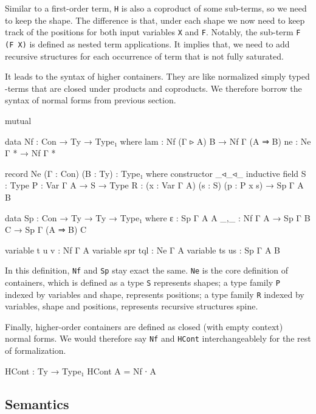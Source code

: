 Similar to a first-order term, \texttt{H} is also a coproduct of some sub-terms, so we need to keep the shape. The difference is that, under each shape we now need to keep track of the positions for both input variables \texttt{X} and \texttt{F}. Notably, the sub-term \texttt{F (F X)} is defined as nested term applications. It implies that, we need to add recursive structures for each occurrence of term that is not fully saturated.

It leads to the syntax of higher containers. They are like normalized simply typed \lambda-terms that are closed under products and coproducts. We therefore borrow the syntax of normal forms from previous section.

\begin{code}[hide]
mutual
\end{code}

\begin{code}
  data Nf : Con → Ty → Type₁ where
    lam : Nf (Γ ▹ A) B → Nf Γ (A ⇒ B)
    ne  : Ne Γ * → Nf Γ *

  record Ne (Γ : Con) (B : Ty) : Type₁ where
    constructor _◃_◃_
    inductive
    field
      S : Type
      P : Var Γ A → S → Type
      R : (x : Var Γ A) (s : S) (p : P x s) → Sp Γ A B

  data Sp : Con → Ty → Ty → Type₁ where
    ε   : Sp Γ A A
    _,_ : Nf Γ A → Sp Γ B C → Sp Γ (A ⇒ B) C
\end{code}

\begin{code}[hide]
  variable t u v : Nf Γ A
  variable spr tql : Ne Γ A
  variable ts us : Sp Γ A B
\end{code}

In this definition, \texttt{Nf} and \texttt{Sp} stay exact the same. \texttt{Ne} is the core definition of containers, which is defined as a type \texttt{S} represents shapes; a type family \texttt{P} indexed by variables and shape, represents positions; a type family \texttt{R} indexed by variables, shape and positions, represents recursive structures spine.

Finally, higher-order containers are defined as closed (with empty context) normal forms. We would therefore say \texttt{Nf} and \texttt{HCont} interchangeablely for the rest of formalization. 

\begin{code}
HCont : Ty → Type₁
HCont A = Nf ∙ A
\end{code}

\subsection{Semantics}

